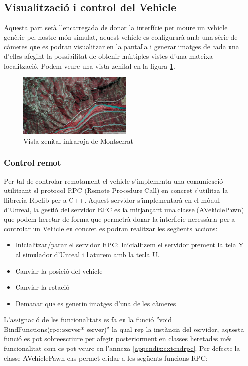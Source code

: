 \documentclass[10pt,a4paper,twocolumn,twoside]{article}
\begin{document}
\subsection{Visualització i control del Vehicle}
Aquesta part serà l'encarregada de donar la interfície per moure un vehicle genèric pel nostre món simulat, aquest vehicle es configurarà amb una sèrie de càmeres que es podran visualitzar en la pantalla i generar imatges de cada una d'elles afegint la possibilitat de obtenir múltiples vistes d'una mateixa localització. Podem veure una vista zenital en la figura \ref{fig-montserratir}.

\begin{figure}[!h]
\centering
  	\includegraphics[width=0.5\textwidth]{cenitalviewir}
	\caption{Vista zenital infraroja de Montserrat}
	\label{fig-montserratir}
\end{figure}

\subsubsection{Control remot}
Per tal de controlar remotament el vehicle s'implementa una comunicació utilitzant el protocol RPC (Remote Procedure Call) en concret s'utilitza la llibreria Rpclib\cite{rpclib} per a C++. Aquest servidor s'implementarà en el mòdul d'Unreal, la gestió del servidor RPC es fa mitjançant una classe (AVehiclePawn) que podem heretar de forma que permetrà donar la interfície necessària per a controlar un Vehicle en concret es podran realitzar les següents accions:

\begin{itemize}
\item Inicialitzar/parar el servidor RPC: Inicialitzem el servidor prement la tela Y al simulador d'Unreal i l'aturem amb la tecla U.
\item Canviar la posició del vehicle
\item Canviar la rotació
\item Demanar que es generin imatges d'una de les càmeres
\end{itemize}

L'assignació de les funcionalitats es fa en la funció ''void BindFunctions(rpc::server* server)'' la qual rep la instància del servidor, aquesta funció es pot sobreescriure per afegir posteriorment en classes heretades més funcionalitat com es pot veure en l'annexa \ref{appendix:extendrpc}. Per defecte la classe AVehiclePawn ens permet cridar a les següents funcions RPC:
\end{document}
